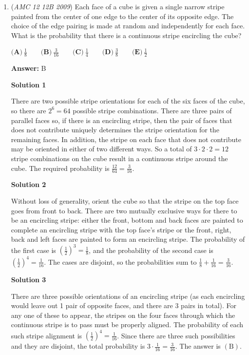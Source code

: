 \begin{enumerate}
	\item (\textit{AMC 12 12B 2009}) Each face of a cube is given a single narrow stripe painted from the center of one edge to the center of its opposite edge.  The choice of the edge pairing is made at random and independently for each face.  What is the probability that there is a continuous stripe encircling the cube?


 $\textbf{(A)}\ \frac {1}{8}\qquad \textbf{(B)}\ \frac {3}{16}\qquad \textbf{(C)}\ \frac {1}{4} \qquad \textbf{(D)}\ \frac {3}{8}\qquad \textbf{(E)}\ \frac {1}{2}$

 \textbf{Answer: }B



\textbf{Solution 1}

There are two possible stripe orientations for each of the six faces of the cube, so there are $2^6 = 64$ possible stripe combinations.  There are three pairs of parallel faces so, if there is an encircling stripe, then the pair of faces that does not contribute uniquely determines the stripe orientation for the remaining faces.  In addition, the stripe on each face that does not contribute may be oriented in either of two different ways. So a total of $3 \cdot 2 \cdot 2 = 12$ stripe combinations on the cube result in a continuous stripe around the cube.  The required probability is $\frac {12}{64} = \boxed{\frac {3}{16}}$.

 



\textbf{Solution 2}

Without loss of generality, orient the cube so that the stripe on the top face goes from front to back.  There are two mutually exclusive ways for there to be an encircling stripe: either the front, bottom and back faces are painted to complete an encircling stripe with the top face's stripe or the front, right, back and left faces are painted to form an encircling stripe.  The probability of the first case is $\left(\frac 12\right)^3 = \frac 18$, and the probability of the second case is $\left(\frac 12\right)^4 = \frac {1}{16}$.  The cases are disjoint, so the probabilities sum to $\frac 18 + \frac {1}{16} = \boxed {\frac {3}{16}}$.

 



\textbf{Solution 3}

There are three possible orientations of an encircling stripe (as each encircling would leave out 1 pair of opposite faces, and there are 3 pairs in total).  For any one of these to appear, the stripes on the four faces through which the continuous stripe is to pass must be properly aligned.  The probability of each such stripe alignment is $\left(\frac 12\right)^4 = \frac {1}{16}$.  Since there are three such possibilities and they are disjoint, the total probability is $3 \cdot \frac {1}{16} = \boxed{\frac {3}{16}}$.  The answer is $\mathrm{(B)}$.


\end{enumerate}
